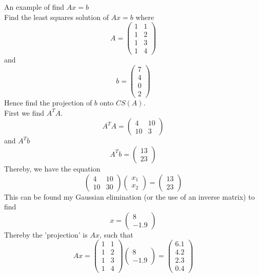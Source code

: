 \documentclass[journal, letterpaper]{IEEEtran}
\begin{document}
    \begin{myboxg}{An example of find $Ax = b$} \\ 
        Find the least squares solution of $Ax = b$ where
        $$ A = \begin{pmatrix}
            1 & 1 \\ 1 & 2 \\ 1 & 3 \\ 1 & 4
        \end{pmatrix}$$
        and 
        $$ b = \begin{pmatrix}
            7 \\ 4 \\ 0 \\ 2
        \end{pmatrix}$$
        Hence find the projection of $b$ onto $CS(A)$.
        \newline \\ 
        First we find $A^TA$.
        $$ A^TA = \begin{pmatrix}
            4 & 10 \\ 10 & 3
        \end{pmatrix}$$
        and $A^Tb$
        $$ A^Tb = \begin{pmatrix}
            13 \\ 23
        \end{pmatrix}$$
        Thereby, we have the equation
        $$
        \begin{pmatrix}
            4 & 10 \\ 10 & 30
        \end{pmatrix} \begin{pmatrix}
            x_1 \\ x_2
        \end{pmatrix} = \begin{pmatrix}
            13 \\ 23
        \end{pmatrix}
        $$  
        This can be found my Gaussian elimination (or the use of an inverse matrix) to find
        $$
        x = \begin{pmatrix}
            8 \\ -1.9
        \end{pmatrix}
        $$
        Thereby the 'projection' is $Ax$, such that
        $$
        Ax = \begin{pmatrix}
            1 & 1 \\ 1 & 2 \\ 1 & 3 \\ 1 &4
        \end{pmatrix}\begin{pmatrix}
            8 \\ -1.9
        \end{pmatrix} = \begin{pmatrix}
            6.1 \\ 4.2 \\ 2.3 \\ 0.4
        \end{pmatrix}
        $$
    \end{myboxg}
\end{document}
